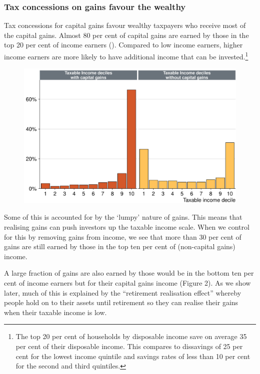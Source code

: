 \documentclass{grattan}\usepackage[]{graphicx}\usepackage[]{color}
\newcommand\gao{Grattan analysis of}
\begin{document}
\subsubsection{Tax concessions on gains favour the wealthy}
Tax concessions for capital gains favour wealthy taxpayers who receive most of the capital gains. Almost 80 per cent of capital gains are earned by those in the top 20 per cent of income earners (). Compared to low income earners, higher income earners are more likely to have additional income that can be invested.\footnote{The top 20 per cent of households by disposable income save on average 35 per cent of their disposable income. This compares to dissavings of 25 per cent for the lowest income quintile and savings rates of less than 10 per cent for the second and third quintiles.}


\begin{figure}
\includegraphics[width=\columnwidth]{figure/Nearly_eighty_per_cent_of_capital_gains_are_earned_by_those_-1}
\source{\gao\ \textcite{ATO2013i}}
\end{figure}
Some of this is accounted for by the `lumpy' nature of gains. This means that realising gains can push investors up the taxable income scale. When we control for this by removing gains from income, we see that more than 30 per cent of gains are still earned by those in the top ten per cent of (non-capital gains) income. 

A large fraction of gains are also earned by those would be in the bottom ten per cent of income earners but for their capital gains income (Figure 2). As we show later, much of this is explained by the ``retirement realisation effect'' whereby people hold on to their assets until retirement so they can realise their gains when their taxable income is low. 
\end{document}
